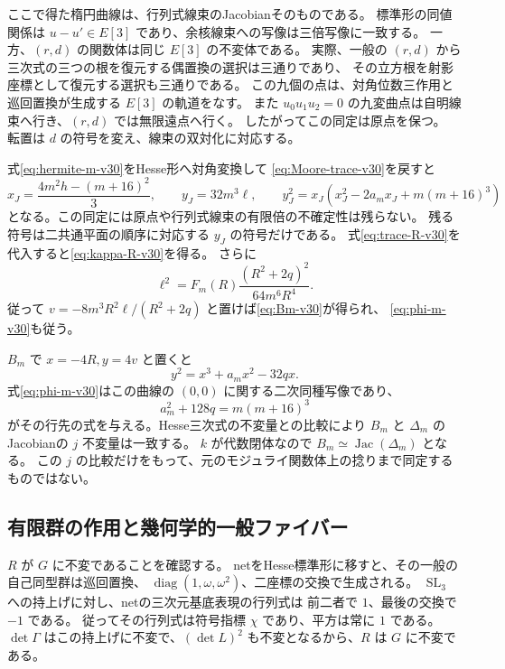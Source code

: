 ここで得た楕円曲線は、行列式線束のJacobianそのものである。
標準形の同値関係は $u-u'\in E[3]$ であり、余核線束への写像は三倍写像に一致する。
一方、$(r,d)$ の関数体は同じ $E[3]$ の不変体である。
実際、一般の $(r,d)$ から三次式の三つの根を復元する偶置換の選択は三通りであり、
その立方根を射影座標として復元する選択も三通りである。
この九個の点は、対角位数三作用と巡回置換が生成する $E[3]$ の軌道をなす。
また $u_0u_1u_2=0$ の九変曲点は自明線束へ行き、$(r,d)$ では無限遠点へ行く。
したがってこの同定は原点を保つ。
転置は $d$ の符号を変え、線束の双対化に対応する。

式\eqref{eq:hermite-m-v30}をHesse形へ対角変換して
\eqref{eq:Moore-trace-v30}を戻すと
\begin{equation}\label{eq:commutator-Weierstrass-v30}
 x_J=\frac{4m^2h-(m+16)^2}{3},\qquad y_J=32m^3\ell,
 \qquad
 y_J^2=x_J(x_J^2-2a_mx_J+m(m+16)^3)
\end{equation}
となる。この同定には原点や行列式線束の有限倍の不確定性は残らない。
残る符号は二共通平面の順序に対応する $y_J$ の符号だけである。
式\eqref{eq:trace-R-v30}を代入すると\eqref{eq:kappa-R-v30}を得る。
さらに
\begin{equation}\label{eq:lie-square-factor-v30}
 \ell^2=F_m(R)\frac{(R^2+2q)^2}{64m^6R^4}.
\end{equation}
従って $v=-8m^3R^2\ell/(R^2+2q)$ と置けば\eqref{eq:Bm-v30}が得られ、
\eqref{eq:phi-m-v30}も従う。

$B_m$ で $x=-4R,y=4v$ と置くと
\[
 y^2=x^3+a_mx^2-32qx.
\]
式\eqref{eq:phi-m-v30}はこの曲線の $(0,0)$ に関する二次同種写像であり、
\[
 a_m^2+128q=m(m+16)^3
\]
がその行先の式を与える。Hesse三次式の不変量との比較により
$B_m$ と $\Delta_m$ のJacobianの $j$ 不変量は一致する。
$k$ が代数閉体なので $B_m\simeq\operatorname{Jac}(\Delta_m)$ となる。
この $j$ の比較だけをもって、元のモジュライ関数体上の捻りまで同定するものではない。

\subsection{有限群の作用と幾何学的一般ファイバー}

$R$ が $G$ に不変であることを確認する。
netをHesse標準形に移すと、その一般の自己同型群は巡回置換、
$\operatorname{diag}(1,\omega,\omega^2)$、二座標の交換で生成される。
$\operatorname{SL}_3$ への持上げに対し、netの三次元基底表現の行列式は
前二者で $1$、最後の交換で $-1$ である。
従ってその行列式は符号指標 $\chi$ であり、平方は常に $1$ である。
$\det\Gamma$ はこの持上げに不変で、$(\det L)^2$ も不変となるから、$R$ は $G$ に不変である。

